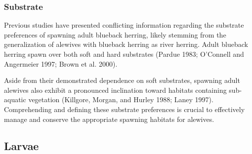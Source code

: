 \documentclass[
]{book}
\begin{document}
\hypertarget{substrate-10}{%
\subsubsection{Substrate}\label{substrate-10}}

Previous studies have presented conflicting information regarding the substrate preferences of spawning adult blueback herring, likely stemming from the generalization of alewives with blueback herring as river herring.
Adult blueback herring spawn over both soft and hard substrates (Pardue 1983; O'Connell and Angermeier 1997; Brown et al. 2000).

Aside from their demonstrated dependence on soft substrates, spawning adult alewives also exhibit a pronounced inclination toward habitats containing sub-aquatic vegetation (Killgore, Morgan, and Hurley 1988; Laney 1997).
Comprehending and defining these substrate preferences is crucial to effectively manage and conserve the appropriate spawning habitats for alewives.

\hypertarget{larvae}{%
\subsection{Larvae}\label{larvae}}
\end{document}
